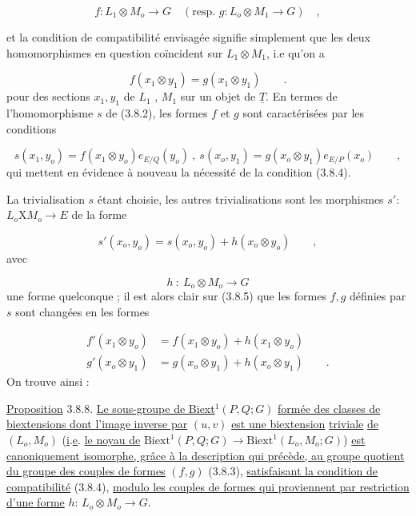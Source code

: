 \begin{equation}\tag{3.8.3}
f : L_1 \otimes M_o \longrightarrow G \quad (\text{resp. } g: L_o \otimes M_1 \longrightarrow G) \quad ,
\end{equation}

et la condition de compatibilité envisagée signifie simplement que les deux homomorphismes en question coïncident sur $L_1 \otimes M_1$, i.e qu'on a

\begin{equation}\tag{3.8.4}
f(x_1 \otimes y_1) = g(x_1 \otimes y_1) \qquad .
\end{equation}
pour des sections $x_1,y_1$ de $L_1$ , $M_1$ sur un objet de $\underline{T}$. En termes de l'homomorphisme $s$ de (3.8.2), les formes $f$ et $g$ sont caractérisées  par les conditions

\begin{equation}\tag{3.8.5}
s(x_1,y_o) = f(x_1 \otimes y_o) e_{E/Q}(y_o) \ , \ s(x_o,y_1) = g(x_o \otimes y_1) e_{E/P}(x_o) \qquad ,
\end{equation}
qui mettent en évidence à nouveau la nécessité de la condition (3.8.4).

La trivialisation $s$ étant choisie, les autres trivialisations sont les morphismes $s'$: $L_o \mathrm{X} M_o \longrightarrow E$ de la forme

\begin{equation}\tag{3.8.6}
s'(x_o,y_o) = s(x_o,y_o) + h(x_o \otimes y_o) \qquad ,
\end{equation}
avec

\begin{equation*}
h \ : \ L_o \otimes M_o \longrightarrow G
\end{equation*}
une forme quelconque ; il est alors clair sur (3.8.5) que les formes $f,g$ définies par $s$ sont changées en les formes

\begin{equation}\tag{3.8.7}
\begin{aligned}
f'(x_1 \otimes y_o) &= f(x_1 \otimes y_o) + h(x_1 \otimes y_o) \\
g'(x_o \otimes y_1) &= g(x_o \otimes y_1) + h(x_o \otimes y_1) \qquad .
\end{aligned}
\end{equation}
On trouve ainsi :

\underline{Proposition} 3.8.8. \underline{Le sous-groupe de Biext}$^1(P,Q;G)$ \underline{formée des classes de biextensions dont l'image inverse par} $(u,v)$ \underline{est une biextension} \underline{triviale} \underline{de} $(L_o,M_o)$ (\underline{i}.\underline{e}. \underline{le noyau de} $\mathrm{Biext}^1(P,Q;G) \longrightarrow \mathrm{Biext}^1(L_o,M_o;G)$) \underline{est canoniquement isomorphe, grâce à la description qui précède, au groupe quotient}
\underline{du groupe des couples de formes} $(f,g)$ (3.8.3), \underline{satisfaisant la condition de compatibilité} (3.8.4), \underline{modulo les couples de formes qui proviennent par restriction d'une forme} $h$: $L_o \otimes M_o \longrightarrow G$.


